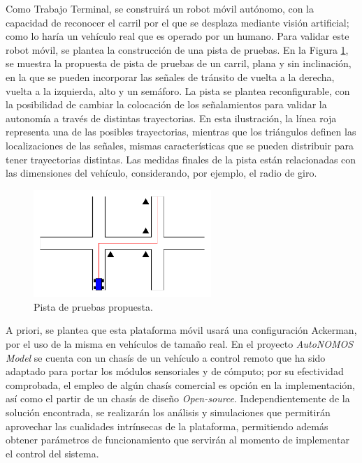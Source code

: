 Como Trabajo Terminal, se construirá un robot móvil autónomo, con la capacidad de reconocer el carril por el que se desplaza mediante visión artificial; como lo haría un vehículo real que es operado por un humano. Para validar este robot móvil, se plantea la construcción de una pista de pruebas. En la Figura \ref{fig:PPruebas}, se muestra la propuesta de pista de pruebas de un carril, plana y sin inclinación, en la que se pueden incorporar las señales de tránsito de vuelta a la derecha, vuelta a la izquierda, alto y un semáforo. La pista se plantea reconfigurable, con la posibilidad de cambiar la colocación de los señalamientos para validar la autonomía a través de distintas trayectorias. En esta ilustración, la línea roja representa una de las posibles trayectorias, mientras que los triángulos definen las localizaciones de las señales, mismas características que se pueden distribuir para tener trayectorias distintas. Las medidas finales de la pista están relacionadas con las dimensiones del vehículo, considerando, por ejemplo, el radio de giro.
\begin{figure}[htbp!]
	\centering
	\includegraphics[width=0.6\textwidth]{./Figuras/Pista/Pista}
	\caption{Pista de pruebas propuesta.}
	\label{fig:PPruebas}
\end{figure}
\par A priori, se plantea que esta plataforma móvil usará una configuración Ackerman, por el uso de la misma en vehículos de tamaño real. En el proyecto {\it AutoNOMOS Model} se cuenta con un chasís de un vehículo a control remoto que ha sido adaptado para portar los módulos sensoriales y de cómputo; por su efectividad comprobada, el empleo de algún chasís comercial es opción en la implementación, así como el partir de un chasís de diseño {\it Open-source}. Independientemente de la solución encontrada, se realizarán los análisis y simulaciones que permitirán aprovechar las cualidades intrínsecas de la plataforma, permitiendo además obtener parámetros de funcionamiento que servirán al momento de implementar el control del sistema.
